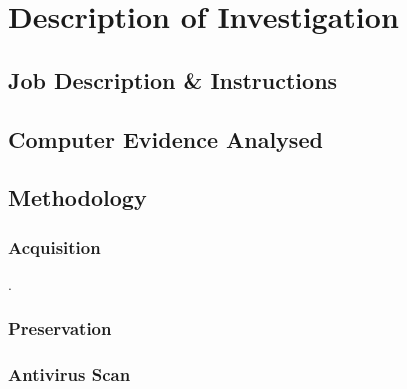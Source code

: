 \documentclass[a4paper,12pt]{article}
\begin{document}
\section{Description of Investigation}
\lipsum[66]
\subsection{Job Description \& Instructions}
\lipsum[66]
\subsection{Computer Evidence Analysed}
\lipsum[66]
\subsection{Methodology}
\lipsum[66]
\subsubsection{Acquisition}
\lipsum[66].
\subsubsection{Preservation}
\lipsum[66]
\subsubsection{Antivirus Scan}
\label{sec:antivirus_scan}
\lipsum[66]
\end{document}
